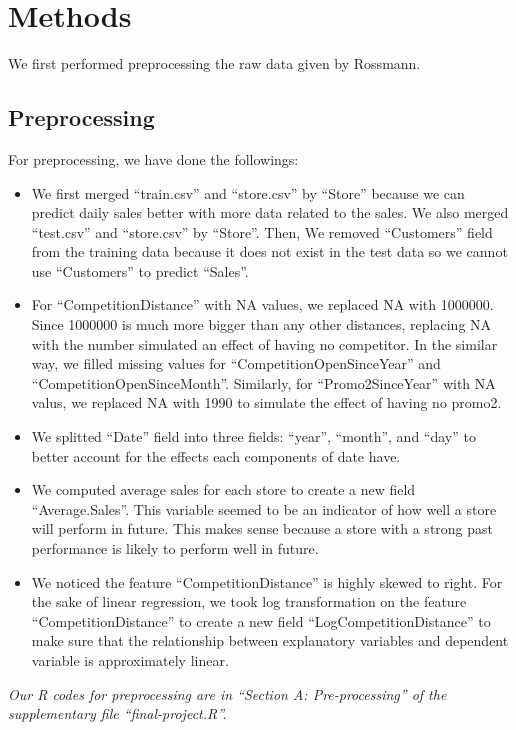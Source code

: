 \documentclass[letterpaper,twocolumn,11pt]{article}
\begin{document}
\section{Methods}
We first performed preprocessing the raw data given by Rossmann.

\subsection{Preprocessing}
For preprocessing, we have done the followings:
\begin{itemize}
\item We first merged ``train.csv'' and ``store.csv'' by ``Store'' because we can predict daily sales better with more data related to the sales. We also merged ``test.csv'' and ``store.csv'' by ``Store''. Then, We removed ``Customers'' field from the training data because it does not exist in the test data so we cannot use ``Customers'' to predict ``Sales''.
\item For ``CompetitionDistance'' with NA values, we replaced NA with 1000000. Since 1000000 is much more bigger than any other distances, replacing NA with the number simulated an effect of having no competitor. In the similar way, we filled missing values for ``CompetitionOpenSinceYear'' and ``CompetitionOpenSinceMonth''. Similarly, for ``Promo2SinceYear'' with NA valus, we replaced NA with 1990 to simulate the effect of having no promo2.
\item We splitted ``Date'' field into three fields: ``year'', ``month'', and ``day'' to better account for the effects each components of date have.
\item We computed average sales for each store to create a new field ``Average.Sales''. This variable seemed to be an indicator of how well a store will perform in future. This makes sense because a store with a strong past performance is likely to perform well in future.
\item  We noticed the feature ``CompetitionDistance'' is highly skewed to right. For the sake of linear regression, we took log transformation on the feature ``CompetitionDistance'' to create a new field ``LogCompetitionDistance'' to make sure that the relationship between explanatory variables and dependent variable is approximately linear.
\end{itemize}

\textit{Our R codes for preprocessing are in ``Section A: Pre-processing'' of the supplementary file ``final-project.R''.}
\end{document}
